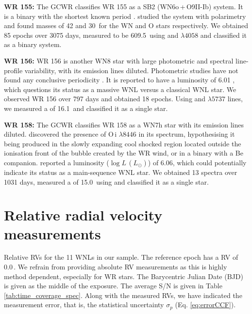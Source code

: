 \textbf{WR 155:} The GCWR classifies WR 155 as a SB2 (WN6o\,+\,O9II-Ib) system. It is a binary with the shortest known period \citep[1.6412436\,d,][]{moffat_photometric_1986,marchenko_wind-wind_1995}. \citet{drissen_polarimetic_1986} studied the system with polarimetry and found masses of 42 and 30\,\Msun{} for the WN and O stars respectively. We obtained 85 epochs over 3075 days, measured \DelRV{} to be 609.5\,\kms{} using \NVred{} and $\lambda 4058$ and classified it as a binary system. 

\textbf{WR 156:} WR 156 is another WN8 star with large photometric and spectral line-profile variability, with its emission lines diluted. Photometric studies have not found any conclusive periodicity \citep{moffat_photometric_1986,marchenko_wolf-rayet_1998}. It is reported to have a luminosity of 6.01 \citep{hamann_galactic_2019}, which questions its status as a massive WNL versus a classical WNL star. We observed WR 156 over 797 days and obtained 18 epochs. Using \NIVred{} and $\lambda 5737$ lines, we measured a \DelRV{} of 16.1\,\kms{} and classified it as a single star.

\textbf{WR 158:} The GCWR classifies WR 158 as a WN7h star with its emission lines diluted. \citet{andrillat_surprising_1992} discovered the presence of O\,{\sc i} $\lambda 8446$ in its spectrum, hypothesising it being produced in the slowly expanding cool shocked region located outside the ionisation front of the bubble created by the WR wind, or in a binary with a Be companion. \citet{hamann_galactic_2019} reported a luminosity ($\log L$\,$(L_\odot)$) of 6.06, which could potentially indicate its status as a main-sequence WNL star. We obtained 13 spectra over 1031 days, measured a \DelRV{} of 15.0\,\kms{} using \NIVred{} and classified it as a single star.

\section{Relative radial velocity measurements}\label{apdx:rv_measurements_wnl}

Relative RVs for the 11 WNLs in our sample. The reference epoch has a RV of 0.0\,\kms{}. We refrain from providing absolute RV measurements as this is highly method dependent, especially for WR stars. The Barycentric Julian Date (BJD) is given as the middle of the exposure. The average S/N is given in Table\,\ref{tab:time_coverage_spec}. Along with the measured RVs, we have indicated the measurement error, that is, the statistical uncertainty $\sigma_p$ (Eq. \ref{eq:errorCCF}). 

